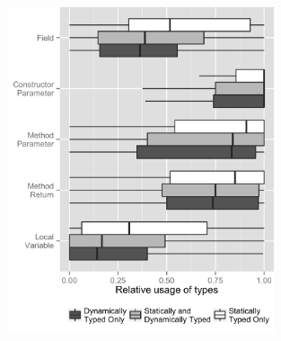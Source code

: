 \documentclass[msc]{ppgccufmg}
\renewcommand{\arraystretch}{1.2}
\begin{document}
\begin{figure}[h]
\centering 
\includegraphics[width=0.7\textwidth]{../aosd_2014/analysis/result/background/comparison/boxplots/6_declarations_by_type.png} 
\vspace{0.1cm}
\renewcommand{\arraystretch}{1.2}



\end{figure}
\end{document}
